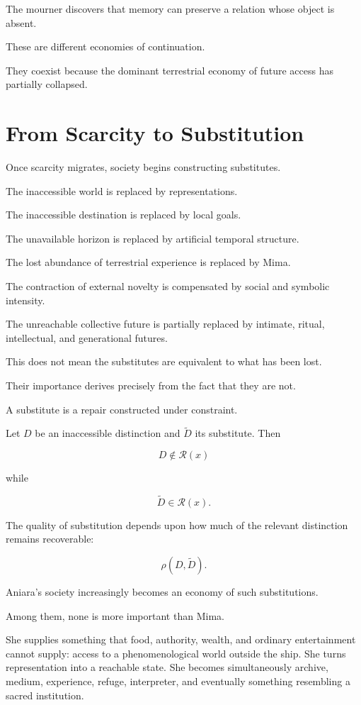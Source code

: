 \documentclass[11pt,oneside]{book}
\theoremstyle{definition}
\theoremstyle{remark}
\newcommand{\R}{\mathcal{R}}
\begin{document}
The mourner discovers that memory can preserve a relation whose object is absent.

These are different economies of continuation.

They coexist because the dominant terrestrial economy of future access has partially collapsed.

\section{From Scarcity to Substitution}

Once scarcity migrates, society begins constructing substitutes.

The inaccessible world is replaced by representations.

The inaccessible destination is replaced by local goals.

The unavailable horizon is replaced by artificial temporal structure.

The lost abundance of terrestrial experience is replaced by Mima.

The contraction of external novelty is compensated by social and symbolic intensity.

The unreachable collective future is partially replaced by intimate, ritual, intellectual, and generational futures.

This does not mean the substitutes are equivalent to what has been lost.

Their importance derives precisely from the fact that they are not.

A substitute is a repair constructed under constraint.

Let \(D\) be an inaccessible distinction and \(\widetilde D\) its substitute. Then

\[
D\notin\R(x)
\]

while

\[
\widetilde D\in\R(x).
\]

The quality of substitution depends upon how much of the relevant distinction remains recoverable:

\[
\rho(D,\widetilde D).
\]

Aniara's society increasingly becomes an economy of such substitutions.

Among them, none is more important than Mima.

She supplies something that food, authority, wealth, and ordinary entertainment cannot supply: access to a phenomenological world outside the ship. She turns representation into a reachable state. She becomes simultaneously archive, medium, experience, refuge, interpreter, and eventually something resembling a sacred institution.
\end{document}
